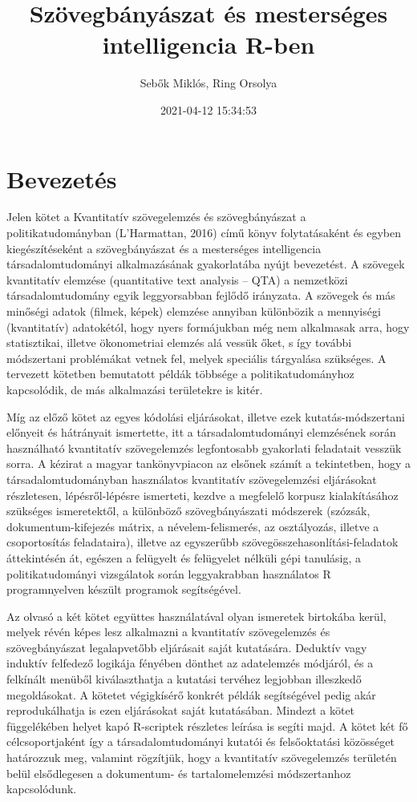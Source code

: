 \documentclass[
]{book}
\title{Szövegbányászat és mesterséges intelligencia R-ben}
\author{Sebők Miklós, Ring Orsolya}
\date{2021-04-12 15:34:53}
\begin{document}
\frontmatter
\maketitle

\mainmatter
\hypertarget{bevezetuxe9s}{%
\chapter{Bevezetés}\label{bevezetuxe9s}}

Jelen kötet a Kvantitatív szövegelemzés és szövegbányászat a
politikatudományban (L'Harmattan, 2016) című könyv folytatásaként és
egyben kiegészítéseként a szövegbányászat és a mesterséges intelligencia
társadalomtudományi alkalmazásának gyakorlatába nyújt bevezetést. A
szövegek kvantitatív elemzése (quantitative text analysis -- QTA) a
nemzetközi társadalomtudomány egyik leggyorsabban fejlődő irányzata. A
szövegek és más minőségi adatok (filmek, képek) elemzése annyiban
különbözik a mennyiségi (kvantitatív) adatokétól, hogy nyers formájukban
még nem alkalmasak arra, hogy statisztikai, illetve ökonometriai elemzés
alá vessük őket, s így további módszertani problémákat vetnek fel,
melyek speciális tárgyalása szükséges. A tervezett kötetben bemutatott
példák többsége a politikatudományhoz kapcsolódik, de más alkalmazási
területekre is kitér.

Míg az előző kötet az egyes kódolási eljárásokat, illetve ezek
kutatás-módszertani előnyeit és hátrányait ismertette, itt a
társadalomtudományi elemzésének során használható kvantitatív
szövegelemzés legfontosabb gyakorlati feladatait vesszük sorra. A
kézirat a magyar tankönyvpiacon az elsőnek számít a tekintetben, hogy a
társadalomtudományban használatos kvantitatív szövegelemzési eljárásokat
részletesen, lépésről-lépésre ismerteti, kezdve a megfelelő korpusz
kialakításához szükséges ismeretektől, a különböző szövegbányászati
módszerek (szózsák, dokumentum-kifejezés mátrix, a névelem-felismerés,
az osztályozás, illetve a csoportosítás feladataira), illetve az
egyszerűbb szövegösszehasonlítási-feladatok áttekintésén át, egészen a
felügyelt és felügyelet nélküli gépi tanulásig, a politikatudományi
vizsgálatok során leggyakrabban használatos R programnyelven készült
programok segítségével.

Az olvasó a két kötet együttes használatával olyan ismeretek birtokába
kerül, melyek révén képes lesz alkalmazni a kvantitatív szövegelemzés és
szövegbányászat legalapvetőbb eljárásait saját kutatására. Deduktív vagy
induktív felfedező logikája fényében dönthet az adatelemzés módjáról, és
a felkínált menüből kiválaszthatja a kutatási tervéhez legjobban
illeszkedő megoldásokat. A kötetet végigkísérő konkrét példák
segítségével pedig akár reprodukálhatja is ezen eljárásokat saját
kutatásában. Mindezt a kötet függelékében helyet kapó R-scriptek
részletes leírása is segíti majd. A kötet két fő célcsoportjaként így a
társadalomtudományi kutatói és felsőoktatási közösséget határozzuk meg,
valamint rögzítjük, hogy a kvantitatív szövegelemzés területén belül
elsődlegesen a dokumentum- és tartalomelemzési módszertanhoz
kapcsolódunk.
\end{document}
